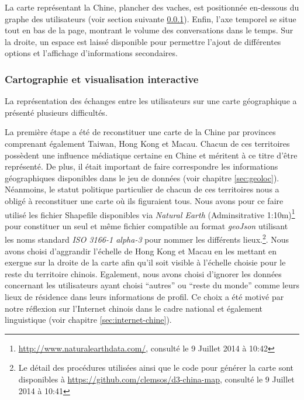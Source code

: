     La carte représentant la Chine, plancher des vaches, est positionnée en-dessous du graphe des utilisateurs (voir section suivante \ref{sec:le_temps_et_la_carte}). Enfin, l'axe temporel se situe tout en bas de la page, montrant le volume des conversations dans le temps. Sur la droite, un espace est laissé disponible pour permettre l'ajout de différentes options et l'affichage d'informations secondaires.
    

\subsubsection{Cartographie et visualisation interactive} 
\label{sec:le_temps_et_la_carte}
    
    La représentation des échanges entre les utilisateurs sur une carte géographique a présenté plusieurs difficultés. 

    La première étape a été de reconstituer une carte de la Chine par provinces comprenant également Taiwan, Hong Kong et Macau. Chacun de ces territoires possèdent une influence médiatique certaine en Chine et méritent à ce titre d{\textquoteright}être représenté. De plus, il était important de faire correspondre les informations géographiques disponibles dans le jeu de données (voir chapitre \ref{sec:geoloc}). Néanmoins, le statut politique particulier de chacun de ces territoires nous a obligé à reconstituer une carte o\`u ils figuraient tous. Nous avons pour ce faire utilisé les fichier Shapefile disponibles via \textit{Natural Earth} (Adminsitrative 1:10m)\footnote{\url{http://www.naturalearthdata.com/}, consulté le 9 Juillet 2014 à 10:42} pour constituer un seul et même fichier compatible au format \textit{geoJson} utilisant les noms standard \textit{ISO 3166-1 alpha-3} pour nommer les différents lieux.\footnote{Le détail des procédures utilisées ainsi que le code pour générer la carte sont disponibles à \url{https://github.com/clemsos/d3-china-map}, consulté le 9 Juillet 2014 à 10:41}. Nous avons choisi d{\textquoteright}aggrandir l{\textquoteright}échelle de Hong Kong et Macau en les mettant en exergue sur la droite de la carte afin qu{\textquoteright}il soit visible à l'échelle choisie pour le reste du territoire chinois. Egalement, nous avons choisi d'ignorer les données concernant les utilisateurs ayant choisi {\textquotedblleft}autres{\textquotedblright} ou {\textquotedblleft}reste du monde{\textquotedblright} comme leurs lieux de résidence dans leurs informations de profil. Ce choix a été motivé par notre réflexion sur l'Internet chinois  dans le cadre national et également linguistique (voir chapitre \ref{sec:internet-chine}).


